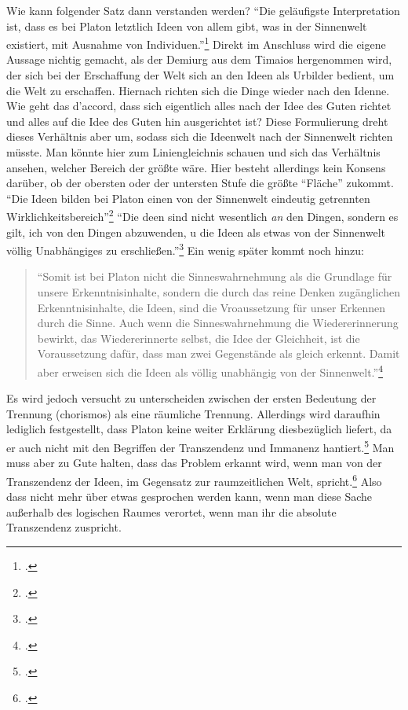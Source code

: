 \documentclass[12pt]{article}
\newcommand*{\zitatblock}[1]{%
    \begin{quote}
    \fontsize{10}{12}\selectfont
    \setlength{\parskip}{1.0em}
    #1
    \end{quote}
}
\begin{document}
Wie kann folgender Satz dann verstanden werden? \enquote{Die geläufigste Interpretation ist, dass es bei Platon letztlich Ideen von allem gibt, was in der Sinnenwelt existiert, mit Ausnahme von Individuen.}\footcite[][S. 31]{DisseMetaphysik} Direkt im Anschluss wird die eigene Aussage nichtig gemacht, als der Demiurg aus dem Timaios hergenommen wird, der sich bei der Erschaffung der Welt sich an den Ideen als Urbilder bedient, um die Welt zu erschaffen. Hiernach richten sich die Dinge wieder nach den Idenne. Wie geht das d'accord, dass sich eigentlich alles nach der Idee des Guten richtet und alles auf die Idee des Guten hin ausgerichtet ist? Diese Formulierung dreht dieses Verhältnis aber um, sodass sich die Ideenwelt nach der Sinnenwelt richten müsste. Man könnte hier zum Liniengleichnis schauen und sich das Verhältnis ansehen, welcher Bereich der größte wäre. Hier besteht allerdings kein Konsens darüber, ob der obersten oder der untersten Stufe die größte \enquote{Fläche} zukommt.
\enquote{Die Ideen bilden bei Platon einen von der Sinnenwelt eindeutig getrennten Wirklichkeitsbereich}\footcite[][S. 31]{DisseMetaphysik}
\enquote{Die deen sind nicht wesentlich \emph{an} den Dingen, sondern es gilt, ich von den Dingen abzuwenden, u die Ideen als etwas von der Sinnenwelt völlig Unabhängiges zu erschließen.}\footcite[][S. 32]{DisseMetaphysik}
Ein wenig später kommt noch hinzu: \zitatblock{\enquote{Somit ist bei Platon nicht die Sinneswahrnehmung als die Grundlage für unsere Erkenntnisinhalte, sondern die durch das reine Denken zugänglichen Erkenntnisinhalte, die Ideen, sind die Vroaussetzung für unser Erkennen durch die Sinne. Auch wenn die Sinneswahrnehmung die Wiedererinnerung bewirkt, das Wiedererinnerte selbst, die Idee der Gleichheit, ist die Voraussetzung dafür, dass man zwei Gegenstände als gleich erkennt. Damit aber erweisen sich die Ideen als völlig unabhängig von der Sinnenwelt.}\footcite[][S. 34]{DisseMetaphysik}}
Es wird jedoch versucht zu unterscheiden zwischen der ersten Bedeutung der Trennung (chorismos) als eine räumliche Trennung. Allerdings wird daraufhin lediglich festgestellt, dass Platon keine weiter Erklärung diesbezüglich liefert, da er auch nicht mit den Begriffen der Transzendenz und Immanenz hantiert.\footcite[vgl.][S. 34f]{DisseMetaphysik} Man muss aber zu Gute halten, dass das Problem erkannt wird, wenn man von der Transzendenz der Ideen, im Gegensatz zur raumzeitlichen Welt, spricht.\footcite[vgl.][S. 35]{DisseMetaphysik} Also dass nicht mehr über etwas gesprochen werden kann, wenn man diese Sache außerhalb des logischen Raumes verortet, wenn man ihr die absolute Transzendenz zuspricht.\\
\end{document}
